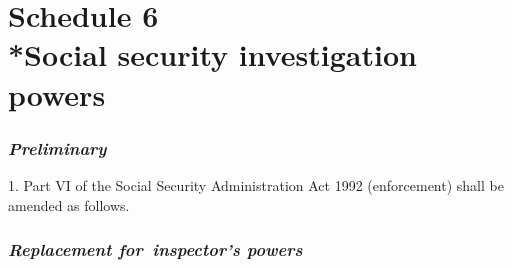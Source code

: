 \documentclass[12pt,a4paper]{article}
\begin{document}
%
%
%
%
%

\vfill

\part[Schedule 6 --- Social security investigation powers]{Schedule 6\\*Social security investigation powers}

\renewcommand\parthead{--- Schedule 6}

\section*{\itshape Preliminary}

1. Part VI of the Social Security Administration Act 1992 (enforcement) shall be amended as follows.

\section*{\itshape Replacement for~inspector’s powers}
\end{document}
